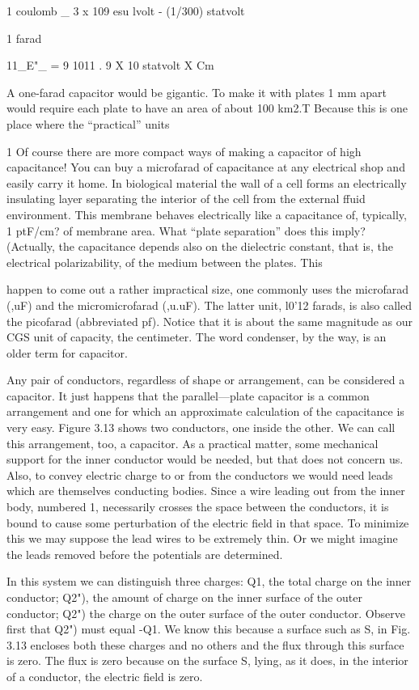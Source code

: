 1 coulomb _ 3 x 109 esu
lvolt - (1/300) statvolt

1 farad

11_E"_ = 9 1011 .
9 X 10 statvolt X Cm

A one-farad capacitor would be gigantic. To make it with plates
1 mm apart would require each plate to have an area of about
100 km2.T Because this is one place where the ``practical'' units

1 Of course there are more compact ways of making a capacitor of high capacitance!
You can buy a microfarad of capacitance at any electrical shop and easily carry it home.
In biological material the wall of a cell forms an electrically insulating layer separating
the interior of the cell from the external ffuid environment. This membrane behaves
electrically like a capacitance of, typically, 1 ptF/cm? of membrane area. What ``plate
separation'' does this imply? (Actually, the capacitance depends also on the dielectric
constant, that is, the electrical polarizability, of the medium between the plates. This

happen to come out a rather impractical size, one commonly uses
the microfarad (,uF) and the micromicrofarad (,u.uF). The latter unit,
l0'12 farads, is also called the picofarad (abbreviated pf). Notice
that it is about the same magnitude as our CGS unit of capacity, the
centimeter. The word condenser, by the way, is an older term for
capacitor.

Any pair of conductors, regardless of shape or arrangement, can
be considered a capacitor. It just happens that the parallel---plate
capacitor is a common arrangement and one for which an approximate
calculation of the capacitance is very easy. Figure 3.13 shows
two conductors, one inside the other. We can call this arrangement,
too, a capacitor. As a practical matter, some mechanical support
for the inner conductor would be needed, but that does not concern
us. Also, to convey electric charge to or from the conductors we
would need leads which are themselves conducting bodies. Since
a wire leading out from the inner body, numbered 1, necessarily
crosses the space between the conductors, it is bound to cause some
perturbation of the electric field in that space. To minimize this we
may suppose the lead wires to be extremely thin. Or we might
imagine the leads removed before the potentials are determined.

In this system we can distinguish three charges: Q1, the total
charge on the inner conductor; Q2"), the amount of charge on the
inner surface of the outer conductor; Q2") the charge on the outer
surface of the outer conductor. Observe first that Q2") must equal
-Q1. We know this because a surface such as S, in Fig. 3.13 encloses
both these charges and no others and the flux through this
surface is zero. The flux is zero because on the surface S, lying, as
it does, in the interior of a conductor, the electric field is zero.

